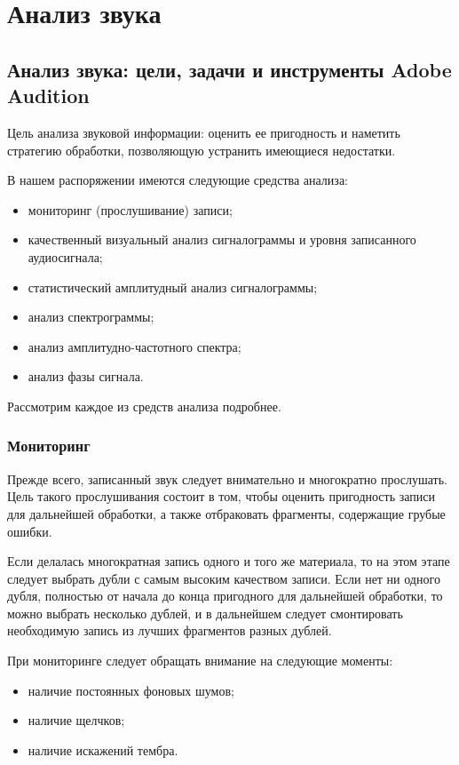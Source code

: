 \documentclass[oneside, final, 14pt]{extreport}
\begin{document}
\setcounter{chapter}{3}
\chapter{Анализ звука}
\section{Анализ звука: цели, задачи и инструменты Adobe Audition}
Цель анализа звуковой информации: оценить ее пригодность и наметить стратегию обработки, позволяющую устранить имеющиеся недостатки.

В нашем распоряжении имеются следующие средства анализа:
\begin{itemize}
\item мониторинг (прослушивание) записи;
\item качественный визуальный анализ сигналограммы и уровня записанного аудиосигнала;
\item статистический амплитудный анализ сигналограммы;
\item анализ спектрограммы;
\item анализ амплитудно-частотного спектра;
\item анализ фазы сигнала.
\end{itemize}

Рассмотрим каждое из средств анализа подробнее.
\subsection{Мониторинг}
Прежде всего, записанный звук следует внимательно и многократно прослушать. Цель такого прослушивания состоит в том, чтобы оценить пригодность записи для дальнейшей обработки, а также отбраковать фрагменты, содержащие грубые ошибки.

Если делалась многократная запись одного и того же материала, то на этом этапе следует выбрать дубли с самым высоким качеством записи. Если нет ни одного дубля, полностью от начала до конца пригодного для дальнейшей обработки, то можно выбрать несколько дублей, и в дальнейшем следует смонтировать необходимую запись из лучших фрагментов разных дублей.

При мониторинге следует обращать внимание на следующие моменты:
\begin{itemize}
\item наличие постоянных фоновых шумов;
\item наличие щелчков;
\item наличие искажений тембра. 
\end{itemize}
\end{document}

